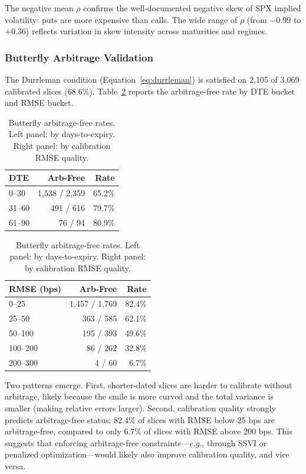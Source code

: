 \documentclass[12pt, letterpaper]{article}
\newcommand{\eg}{\textit{e.g.}}
\begin{document}
The negative mean $\rho$ confirms the well-documented negative skew of SPX implied volatility: puts are more expensive than calls. The wide range of $\rho$ (from $-0.99$ to $+0.36$) reflects variation in skew intensity across maturities and regimes.

\subsubsection{Butterfly Arbitrage Validation}

The Durrleman condition (Equation~\ref{eq:durrleman}) is satisfied on 2,105 of 3,069 calibrated slices (68.6\%). Table~\ref{tab:butterfly} reports the arbitrage-free rate by DTE bucket and RMSE bucket.

\begin{table}[H]
\centering
\caption{Butterfly arbitrage-free rates. Left panel: by days-to-expiry. Right panel: by calibration RMSE quality.}
\label{tab:butterfly}
\begin{minipage}{0.45\textwidth}
\centering
\begin{tabular}{lrr}
\toprule
DTE & Arb-Free & Rate \\
\midrule
0--30   & 1,538 / 2,359 & 65.2\% \\
31--60  & 491 / 616     & 79.7\% \\
61--90  & 76 / 94       & 80.9\% \\
\bottomrule
\end{tabular}
\end{minipage}
\hfill
\begin{minipage}{0.50\textwidth}
\centering
\begin{tabular}{lrr}
\toprule
RMSE (bps) & Arb-Free & Rate \\
\midrule
0--25       & 1,457 / 1,769 & 82.4\% \\
25--50      & 363 / 585     & 62.1\% \\
50--100     & 195 / 393     & 49.6\% \\
100--200    & 86 / 262      & 32.8\% \\
200--300    & 4 / 60        & 6.7\% \\
\bottomrule
\end{tabular}
\end{minipage}
\end{table}

Two patterns emerge. First, shorter-dated slices are harder to calibrate without arbitrage, likely because the smile is more curved and the total variance is smaller (making relative errors larger). Second, calibration quality strongly predicts arbitrage-free status: 82.4\% of slices with RMSE below 25 bps are arbitrage-free, compared to only 6.7\% of slices with RMSE above 200 bps. This suggests that enforcing arbitrage-free constraints---\eg, through SSVI \citep{Gatheral2014} or penalized optimization---would likely also improve calibration quality, and vice versa.
\end{document}
